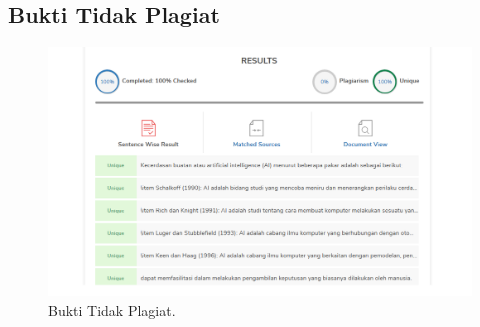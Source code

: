 \subsection{Bukti Tidak Plagiat}
\begin{figure}[H]
	\includegraphics[width=1\textwidth]{figures/chapter1/plagiat.PNG}
	\centering
	\caption{Bukti Tidak Plagiat.}
\end{figure}